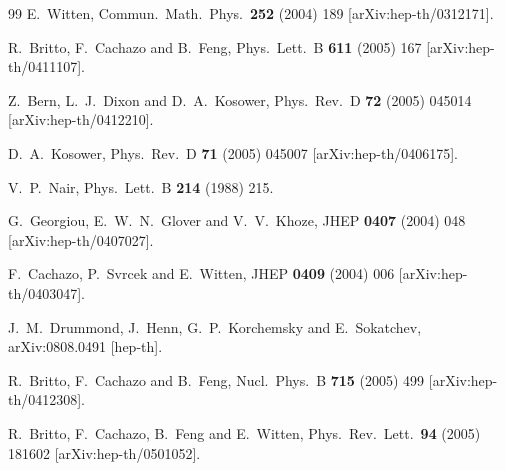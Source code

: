 \documentclass[12pt]{article}
\begin{document}
{\begin{thebibliography}{99}
  E.~Witten,
  Commun.\ Math.\ Phys.\  {\bf 252} (2004) 189
  [arXiv:hep-th/0312171].

  R.~Britto, F.~Cachazo and B.~Feng,
  Phys.\ Lett.\  B {\bf 611} (2005) 167
  [arXiv:hep-th/0411107].

  Z.~Bern, L.~J.~Dixon and D.~A.~Kosower,
  Phys.\ Rev.\  D {\bf 72} (2005) 045014
  [arXiv:hep-th/0412210].

  D.~A.~Kosower,
  Phys.\ Rev.\  D {\bf 71} (2005) 045007
  [arXiv:hep-th/0406175].



  V.~P.~Nair,
  Phys.\ Lett.\  B {\bf 214} (1988) 215.

  G.~Georgiou, E.~W.~N.~Glover and V.~V.~Khoze,
  JHEP {\bf 0407} (2004) 048
  [arXiv:hep-th/0407027].

  F.~Cachazo, P.~Svrcek and E.~Witten,
  JHEP {\bf 0409} (2004) 006
  [arXiv:hep-th/0403047].

  J.~M.~Drummond, J.~Henn, G.~P.~Korchemsky and E.~Sokatchev,
  arXiv:0808.0491 [hep-th].

  R.~Britto, F.~Cachazo and B.~Feng,
  Nucl.\ Phys.\  B {\bf 715} (2005) 499
  [arXiv:hep-th/0412308].


  R.~Britto, F.~Cachazo, B.~Feng and E.~Witten,
  Phys.\ Rev.\ Lett.\  {\bf 94} (2005) 181602
  [arXiv:hep-th/0501052].


\end{thebibliography}}
\end{document}
